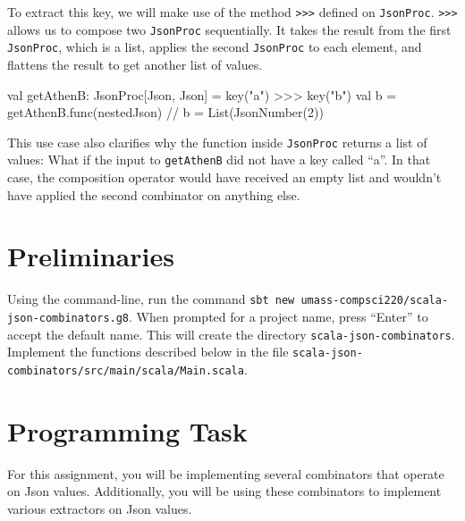\documentclass[9pt]{extbook}
\begin{document}
To extract this key, we will make use of the method \texttt{>>>} defined on
\texttt{JsonProc}. \texttt{>>>} allows us to compose two \texttt{JsonProc}
sequentially. It takes the result from the first \texttt{JsonProc}, which is a
list, applies the second \texttt{JsonProc} to each element, and flattens the result
to get another list of values.
\begin{scalacode}
val getAthenB: JsonProc[Json, Json] = key("a") >>> key("b")
val b = getAthenB.func(nestedJson) // b = List(JsonNumber(2))
\end{scalacode}
This use case also clarifies why the function inside \texttt{JsonProc} returns
a list of values: What if the input to \texttt{getAthenB} did not have a key
called ``a''. In that case, the composition operator would have received an
empty list and wouldn't have applied the second combinator on anything else.

\section{Preliminaries}
Using the command-line, run the command
\verb|sbt new umass-compsci220/scala-json-combinators.g8|. When prompted for
a project name, press ``Enter'' to accept the default name. This will create
the directory \verb|scala-json-combinators|. Implement the functions described
below in the file \verb|scala-json-combinators/src/main/scala/Main.scala|.

\section{Programming Task}
For this assignment, you will be implementing several combinators that operate
on Json values. Additionally, you will be using these combinators to implement
various extractors on Json values.
\end{document}
